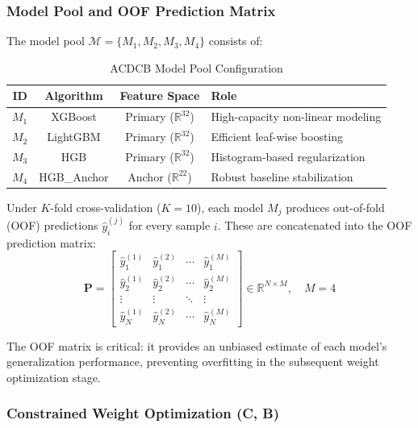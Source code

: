 \documentclass[journal]{IEEEtran}
\begin{document}
\subsubsection{Model Pool and OOF Prediction Matrix}

The model pool $\mathcal{M} = \{M_1, M_2, M_3, M_4\}$ consists of:

\begin{table}[!t]
\renewcommand{\arraystretch}{1.2}
\caption{ACDCB Model Pool Configuration}
\label{tab:model_pool}
\centering
\begin{tabular}{cccp{4.2cm}}
\toprule
\textbf{ID} & \textbf{Algorithm} & \textbf{Feature Space} & \textbf{Role} \\
\midrule
$M_1$ & XGBoost   & Primary ($\mathbb{R}^{32}$) & High-capacity non-linear modeling \\
$M_2$ & LightGBM  & Primary ($\mathbb{R}^{32}$) & Efficient leaf-wise boosting \\
$M_3$ & HGB       & Primary ($\mathbb{R}^{32}$) & Histogram-based regularization \\
$M_4$ & HGB\_Anchor & Anchor ($\mathbb{R}^{22}$) & Robust baseline stabilization \\
\bottomrule
\end{tabular}
\end{table}

Under $K$-fold cross-validation ($K = 10$), each model $M_j$ produces out-of-fold (OOF) predictions $\hat{y}_i^{(j)}$ for every sample $i$. These are concatenated into the OOF prediction matrix:
\begin{equation}
\mathbf{P} = \begin{bmatrix}
\hat{y}_1^{(1)} & \hat{y}_1^{(2)} & \cdots & \hat{y}_1^{(M)} \\
\hat{y}_2^{(1)} & \hat{y}_2^{(2)} & \cdots & \hat{y}_2^{(M)} \\
\vdots & \vdots & \ddots & \vdots \\
\hat{y}_N^{(1)} & \hat{y}_N^{(2)} & \cdots & \hat{y}_N^{(M)}
\end{bmatrix} \in \mathbb{R}^{N \times M}, \quad M = 4
\end{equation}

The OOF matrix is critical: it provides an unbiased estimate of each model's generalization performance, preventing overfitting in the subsequent weight optimization stage.

\subsubsection{Constrained Weight Optimization (C, B)}
\end{document}
